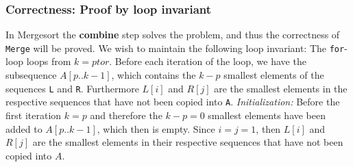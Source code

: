 \subsubsection*{Correctness: Proof by loop invariant}
In Mergesort the \textbf{combine} step solves the problem, and thus the
correctness of \texttt{Merge} will be proved.\newline\newline
We wish to maintain the following loop invariant:
\newline\newline
The \texttt{for}-loop loops from $k=p to r$. Before each iteration of the loop,
we have the subsequence $A[p..k-1]$, which contains the $k-p$ smallest
elements of the sequences \texttt{L} and \texttt{R}. Furthermore $L[i]$ and
$R[j]$ are the smallest elements in the respective sequences that have not been
copied into \texttt{A}.
\newline\newline
\textit{Initialization:}\newline
Before the first iteration $k=p$ and therefore the $k-p=0$ smallest elements
have been added to $A[p..k-1]$, which then is empty. Since $i=j=1$, then $L[i]$
and $R[j]$ are the smallest elements in their respective sequences that have not
been copied into $A$.
